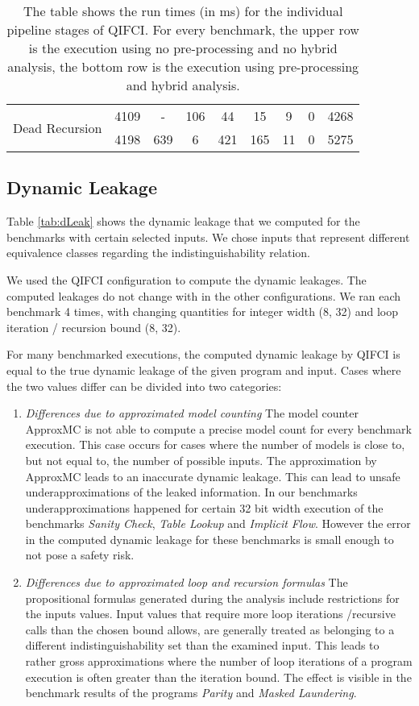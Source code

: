 \begin{table}[]
{\begin{tabular}{c|c|c|c|cc|cc|c}
\multirow{2}{*}{Dead Recursion}         & 4109           & -           & 106         & 44          & 15   & 9             & 0        & 4268           \\
                                        & 4198           & 639         & 6           & 421         & 165  & 11            & 0        & 5275          
\end{tabular}
}
\caption{The table shows the run times (in ms) for the individual pipeline stages of QIFCI. For every benchmark, the upper row is the execution using no pre-processing and no hybrid analysis, the bottom row is the execution using pre-processing and hybrid analysis.}\label{tab:time}
\end{table}

\subsection{Dynamic Leakage}
Table \ref{tab:dLeak} shows the dynamic leakage that we computed for the benchmarks with certain selected inputs. We chose inputs that represent different equivalence classes regarding the indistinguishability relation.

We used the QIFCI configuration to compute the dynamic leakages. The computed leakages do not change with in the other configurations. We ran each benchmark 4 times, with changing quantities for integer width (8, 32) and loop iteration / recursion bound (8, 32).

For many benchmarked executions, the computed dynamic leakage by QIFCI is equal to the true dynamic leakage of the given program and input. Cases where the two values differ can be divided into two categories:

\begin{enumerate}
    \item \emph{Differences due to approximated model counting} The model counter ApproxMC is not able to compute a precise model count for every benchmark execution. This case occurs for cases where the number of models is close to, but not equal to, the number of possible inputs. The approximation by ApproxMC leads to an inaccurate dynamic leakage. This can lead to unsafe underapproximations of the leaked information. In our benchmarks underapproximations happened for certain 32 bit width execution of the benchmarks \emph{Sanity Check}, \emph{Table Lookup} and \emph{Implicit Flow}. However the error in the computed dynamic leakage for these benchmarks is small enough to not pose a safety risk.
    \item \emph{Differences due to approximated loop and recursion formulas} The propositional formulas generated during the analysis include restrictions for the inputs values. Input values that require more loop iterations /recursive calls than the chosen bound allows, are generally treated as belonging to a different indistinguishability set than the examined input. This leads to rather gross approximations where the number of loop iterations of a program execution is often greater than the iteration bound. The effect is visible in the benchmark results of the programs \emph{Parity} and \emph{Masked Laundering}.
\end{enumerate}

